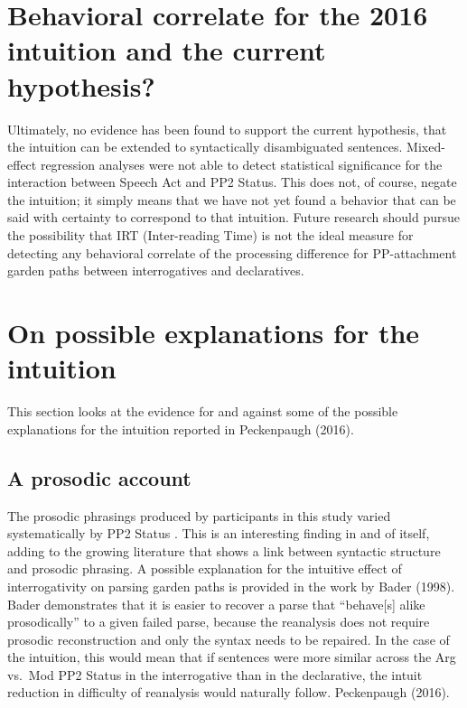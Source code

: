 \documentclass[12pt,oneside]{book}
\begin{document}
\hypertarget{behavioral-correlate-for-the-2016-intuition-and-the-current-hypothesis}{%
\section{Behavioral correlate for the 2016 intuition and the current hypothesis?}\label{behavioral-correlate-for-the-2016-intuition-and-the-current-hypothesis}}


Ultimately, no evidence has been found to support the current hypothesis, that the intuition can be extended to syntactically disambiguated sentences. Mixed-effect regression analyses were not able to detect statistical significance for the interaction between Speech Act and PP2 Status. This does not, of course, negate the intuition; it simply means that we have not yet found a behavior that can be said with certainty to correspond to that intuition. Future research should pursue the possibility that IRT (Inter-reading Time) is not the ideal measure for detecting any behavioral correlate of the processing difference for PP-attachment garden paths between interrogatives and declaratives.

\hypertarget{on-possible-explanations-for-the-intuition}{%
\section{On possible explanations for the intuition}\label{on-possible-explanations-for-the-intuition}}

This section looks at the evidence for and against some of the possible explanations for the intuition reported in Peckenpaugh (2016).

\hypertarget{prep}{%
\subsection{A prosodic account}\label{prep}}

The prosodic phrasings produced by participants in this study varied systematically by PP2 Status . This is an interesting finding in and of itself, adding to the growing literature that shows a link between syntactic structure and prosodic phrasing. A possible explanation for the intuitive effect of interrogativity on parsing garden paths is provided in the work by Bader (1998). Bader demonstrates that it is easier to recover  a  parse that ``behave{[}s{]} alike prosodically'' to a given failed parse, because the reanalysis does not require prosodic reconstruction and only the syntax needs to be repaired. In the case of the  intuition, this would mean that if sentences were more  similar across the Arg vs.~Mod PP2 Status in the interrogative than in the declarative, the intuit reduction in difficulty of reanalysis would naturally follow.  Peckenpaugh (2016).
\end{document}
